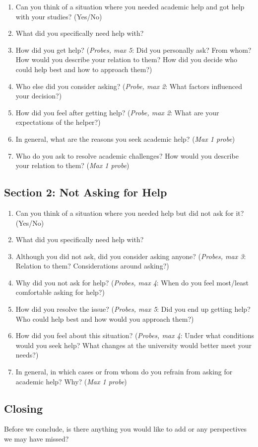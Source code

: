 \documentclass[12pt]{article}
\begin{document}
\begin{enumerate}
  \item Can you think of a situation where you needed academic help and
    got help with your studies? (Yes/No)
  \item What did you specifically need help with?
  \item How did you get help? (\textit{Probes, max 5}: Did you
    personally ask? From whom? How would you describe your relation to
    them? How did you decide who could help best and how to approach
    them?)
  \item Who else did you consider asking? (\textit{Probe, max 2}: What
    factors influenced your decision?)
  \item How did you feel after getting help? (\textit{Probe, max 2}:
    What are your expectations of the helper?)
  \item In general, what are the reasons you seek academic help?
    (\textit{Max 1 probe})
  \item Who do you ask to resolve academic challenges? How would you
    describe your relation to them? (\textit{Max 1 probe})
\end{enumerate}

\subsection*{Section 2: Not Asking for Help}

\begin{enumerate}
  \item Can you think of a situation where you needed help but did not
    ask for it? (Yes/No)
  \item What did you specifically need help with?
  \item Although you did not ask, did you consider asking anyone?
    (\textit{Probes, max 3}: Relation to them? Considerations around
    asking?)
  \item Why did you not ask for help? (\textit{Probes, max 4}: When do
    you feel most/least comfortable asking for help?)
  \item How did you resolve the issue? (\textit{Probes, max 5}: Did
    you end up getting help? Who could help best and how would you
    approach them?)
  \item How did you feel about this situation? (\textit{Probes, max 4}:
    Under what conditions would you seek help? What changes at the
    university would better meet your needs?)
  \item In general, in which cases or from whom do you refrain from
    asking for academic help? Why? (\textit{Max 1 probe})
\end{enumerate}

\subsection*{Closing}

Before we conclude, is there anything you would like to add or any perspectives we may have missed?
\end{document}
